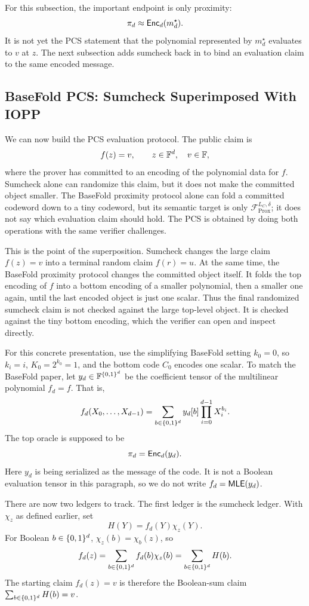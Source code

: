For this subsection, the important endpoint is only proximity:
\[
  \pi_d \approx \mathsf{Enc}_d(m_d^\star).
\]
It is not yet the PCS statement that the polynomial represented by
$m_d^\star$ evaluates to $v$ at $z$.  The next subsection adds sumcheck back in
to bind an evaluation claim to the same encoded message.

\subsection{BaseFold PCS: Sumcheck Superimposed With IOPP}

We can now build the PCS evaluation protocol.  The public claim is
\[
  f(z)=v,
  \qquad z\in\mathbb{F}^d,\quad v\in\mathbb{F},
\]
where the prover has committed to an encoding of the polynomial data for
$f$.  Sumcheck alone can randomize this claim, but it does not make the committed
object smaller.  The BaseFold proximity protocol alone can fold a committed
codeword down to a tiny codeword, but its semantic target is only
\(\mathcal F_{\mathrm{Prox}}^{L_C,\delta}\); it does not say which evaluation
claim should hold.  The PCS is obtained by doing both operations with the same
verifier challenges.

This is the point of the superposition.  Sumcheck changes the large claim
$f(z)=v$ into a terminal random claim $f(r)=u$.  At the same time, the
BaseFold proximity protocol changes the committed object itself.  It folds the
top encoding of $f$ into a bottom encoding of a smaller polynomial, then a
smaller one again, until the last encoded object is just one scalar.  Thus the
final randomized sumcheck claim is not checked against the large top-level
object.  It is checked against the tiny bottom encoding, which the verifier can
open and inspect directly.

For this concrete presentation, use the simplifying BaseFold setting $k_0=0$,
so $k_i=i$, $K_0=2^{k_0}=1$, and the bottom code $C_0$ encodes one scalar.  To
match the BaseFold paper, let $y_d\in\mathbb{F}^{\{0,1\}^d}$ be the coefficient tensor of the
multilinear polynomial $f_d=f$.  That is,
\[
  f_d(X_0,\ldots,X_{d-1})
  =
  \sum_{b\in\{0,1\}^d} y_d[b]\prod_{i=0}^{d-1}X_i^{b_i}.
\]
The top oracle is supposed to be
\[
  \pi_d=\mathsf{Enc}_d(y_d).
\]
Here $y_d$ is being serialized as the message of the code.  It is not a Boolean
evaluation tensor in this paragraph, so we do not write $f_d=\mathsf{MLE}(y_d)$.

There are now two ledgers to track.  The first ledger is the sumcheck ledger.
With $\chi_z$ as defined earlier, set
\[
  H(Y)=f_d(Y)\chi_z(Y).
\]
For Boolean $b\in\{0,1\}^d$, $\chi_z(b)=\chi_b(z)$, so
\[
  f_d(z)
  =
  \sum_{b\in\{0,1\}^d}f_d(b)\chi_z(b)
  =
  \sum_{b\in\{0,1\}^d}H(b).
\]
The starting claim $f_d(z)=v$ is therefore the Boolean-sum claim
$\sum_{b\in\{0,1\}^d}H(b)=v$.

